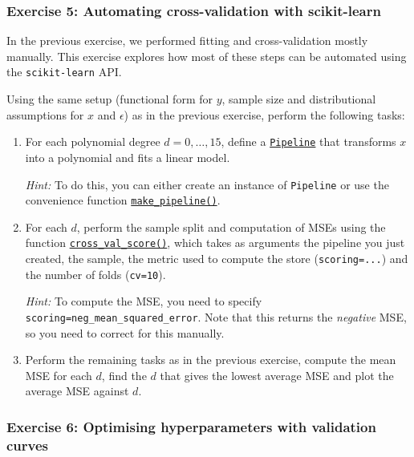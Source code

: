 \documentclass{scrartcl}
\begin{document}
    \hypertarget{exercise-5-automating-cross-validation-with-scikit-learn}{%
\subsubsection{Exercise 5: Automating cross-validation with
scikit-learn}\label{exercise-5-automating-cross-validation-with-scikit-learn}}

In the previous exercise, we performed fitting and cross-validation
mostly manually. This exercise explores how most of these steps can be
automated using the \texttt{scikit-learn} API.

Using the same setup (functional form for \(y\), sample size and
distributional assumptions for \(x\) and \(\epsilon\)) as in the
previous exercise, perform the following tasks:

\begin{enumerate}
\def\labelenumi{\arabic{enumi}.}
\item
  For each polynomial degree \(d = 0,\dots,15\), define a
  \href{https://scikit-learn.org/stable/modules/generated/sklearn.pipeline.Pipeline.html}{\texttt{Pipeline}}
  that transforms \(x\) into a polynomial and fits a linear model.

  \emph{Hint:} To do this, you can either create an instance of
  \texttt{Pipeline} or use the convenience function
  \href{https://scikit-learn.org/stable/modules/generated/sklearn.pipeline.make_pipeline.html}{\texttt{make\_pipeline()}}.
\item
  For each \(d\), perform the sample split and computation of MSEs using
  the function
  \href{https://scikit-learn.org/stable/modules/generated/sklearn.model_selection.cross_val_score.html}{\texttt{cross\_val\_score()}},
  which takes as arguments the pipeline you just created, the sample,
  the metric used to compute the store (\texttt{scoring=...}) and the
  number of folds (\texttt{cv=10}).

  \emph{Hint:} To compute the MSE, you need to specify
  \texttt{scoring=\textquotesingle{}neg\_mean\_squared\_error\textquotesingle{}}.
  Note that this returns the \emph{negative} MSE, so you need to correct
  for this manually.
\item
  Perform the remaining tasks as in the previous exercise, \ie compute
  the mean MSE for each \(d\), find the \(d\) that gives the lowest
  average MSE and plot the average MSE against \(d\).
\end{enumerate}

    \hypertarget{exercise-6-optimising-hyperparameters-with-validation-curves}{%
\subsubsection{Exercise 6: Optimising hyperparameters with validation
curves}\label{exercise-6-optimising-hyperparameters-with-validation-curves}}
\end{document}
